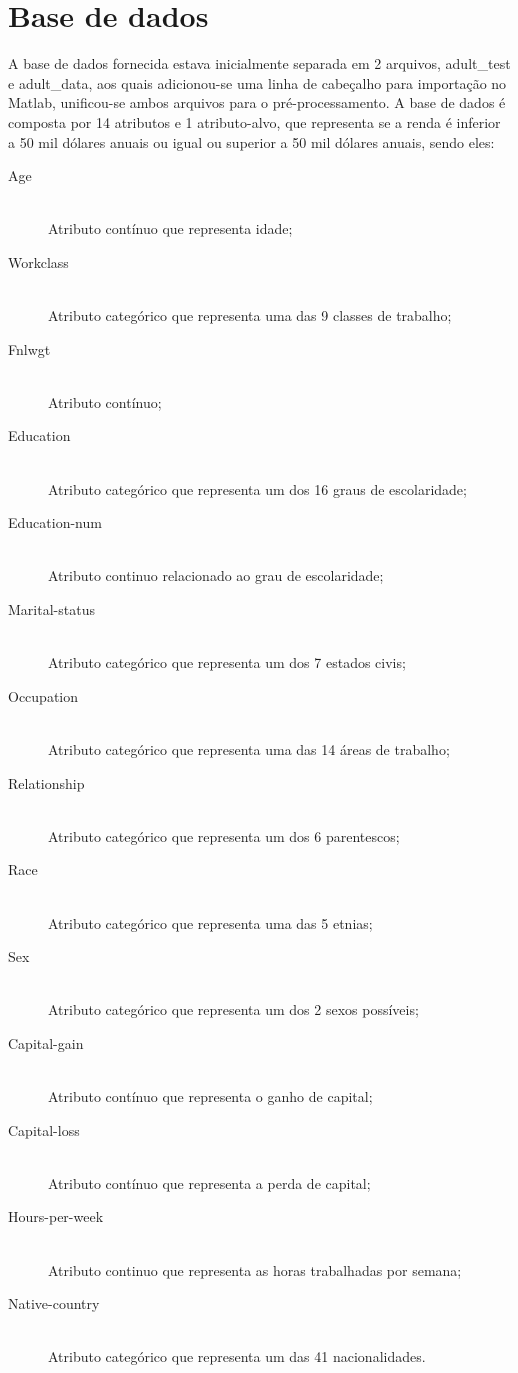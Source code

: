 \section{Base de dados}
A base de dados fornecida estava inicialmente separada em 2 arquivos, adult\_test e adult\_data, aos quais adicionou-se uma linha de cabeçalho para importação no Matlab, unificou-se ambos arquivos para o pré-processamento. A base de dados é composta por 14 atributos e 1 atributo-alvo, que representa se a renda é inferior a 50 mil dólares anuais ou igual ou superior a 50 mil dólares anuais, sendo eles:

\begin{description}
\item[Age] \hfill \\ Atributo contínuo que representa idade;
\item[Workclass] \hfill \\ Atributo categórico que representa uma das 9 classes de trabalho;
\item[Fnlwgt] \hfill \\ Atributo contínuo;
\item[Education] \hfill \\ Atributo categórico que representa um dos 16 graus de escolaridade;
\item[Education-num] \hfill \\ Atributo continuo relacionado ao grau de escolaridade;
\item[Marital-status] \hfill \\ Atributo categórico que representa um dos 7 estados civis;
\item[Occupation] \hfill \\ Atributo categórico que representa uma das 14 áreas de trabalho;
\item[Relationship] \hfill \\ Atributo categórico que representa um dos 6 parentescos;
\item[Race] \hfill \\ Atributo categórico que representa uma das 5 etnias;
\item[Sex] \hfill \\ Atributo categórico que representa um dos 2 sexos possíveis;
\item[Capital-gain] \hfill \\ Atributo contínuo que representa o ganho de capital;
\item[Capital-loss] \hfill \\ Atributo contínuo que representa a perda de capital;
\item[Hours-per-week] \hfill \\ Atributo continuo que representa as horas trabalhadas por semana;
\item[Native-country] \hfill \\ Atributo categórico que representa um das 41 nacionalidades.
\end{description}

